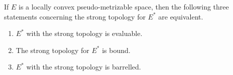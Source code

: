 If $E$ is a locally convex pseudo-metrizable space, then the following three statements concerning the strong topology for $E^*$ are equivalent.
\begin{enumerate}
\item[(i)] $E^*$ with the strong topology is evaluable.
\item[(ii)] The strong topology for $E^*$ is bound.
\item[(iii)] $E^*$ with the strong topology is barrelled.
\end{enumerate}
